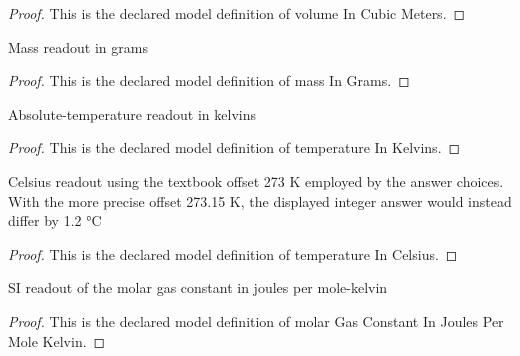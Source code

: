 \begin{proof}
  This is the declared model definition of volume In Cubic Meters.
\end{proof}
\begin{definition}
  \label{def:physics:phyx-mini-0373:phyxminiproblems-problemphyxmini0373-massingrams}
  Mass readout in grams
\end{definition}
\begin{proof}
  This is the declared model definition of mass In Grams.
\end{proof}
\begin{definition}
  \label{def:physics:phyx-mini-0373:phyxminiproblems-problemphyxmini0373-temperatureinkelvins}
  Absolute-temperature readout in kelvins
\end{definition}
\begin{proof}
  This is the declared model definition of temperature In Kelvins.
\end{proof}
\begin{definition}
  \label{def:physics:phyx-mini-0373:phyxminiproblems-problemphyxmini0373-temperatureincelsius}
  Celsius readout using the textbook offset 273 K employed by the answer choices. With the more precise offset 273.15 K, the displayed integer answer would instead differ by 1.2 °C
\end{definition}
\begin{proof}
  This is the declared model definition of temperature In Celsius.
\end{proof}
\begin{definition}
  \label{def:physics:phyx-mini-0373:phyxminiproblems-problemphyxmini0373-molargasconstantinjoulespermolekelvin}
  SI readout of the molar gas constant in joules per mole-kelvin
\end{definition}
\begin{proof}
  This is the declared model definition of molar Gas Constant In Joules Per Mole Kelvin.
\end{proof}
